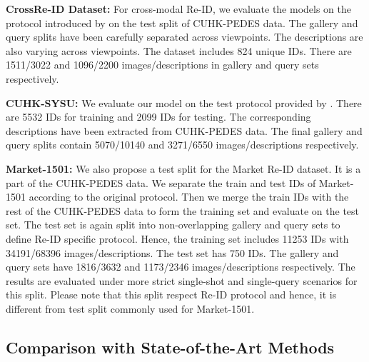 \documentclass[10pt,twocolumn,letterpaper]{article}
\begin{document}
\noindent\textbf{CrossRe-ID Dataset:}
For cross-modal Re-ID, we evaluate the models on the protocol introduced by \cite{farooq2020IJCB} on the test split of CUHK-PEDES data. The gallery and query splits have been carefully separated across viewpoints. The descriptions are also varying across viewpoints. The dataset includes 824 unique IDs. There are 1511/3022 and 1096/2200 images/descriptions in gallery and query sets respectively. 

\noindent\textbf{CUHK-SYSU:}
We evaluate our model on the test protocol provided by \cite{farooq2020convolutional}. 
There are 5532 IDs for training and 2099 IDs for testing. The corresponding descriptions have been extracted from CUHK-PEDES data. The final gallery and query splits contain 5070/10140 and 3271/6550 images/descriptions respectively.

\noindent\textbf{Market-1501:}
We also propose a test split for the Market Re-ID dataset. It is a part of the CUHK-PEDES data. We separate the train and test IDs of Market-1501 according to the original protocol. Then we merge the train IDs with the rest of the CUHK-PEDES data to form the training set and evaluate on the test set. The test set is again split into non-overlapping gallery and query sets to define Re-ID specific protocol. Hence, the training set includes 11253 IDs with 34191/68396 images/descriptions. The test set has 750 IDs. The gallery and query sets have 1816/3632 and 1173/2346 images/descriptions respectively. The results are evaluated under more strict single-shot and single-query scenarios for this split.
Please note that this split respect Re-ID protocol and hence, it is different from test split commonly used for Market-1501. 
\subsection{Comparison with State-of-the-Art Methods}
\end{document}
